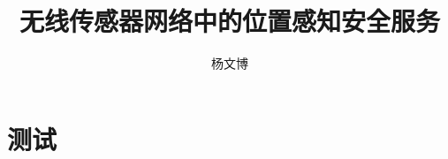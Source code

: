 \documentclass{article}
\title{无线传感器网络中的位置感知安全服务}
\author{杨文博}
\begin{document}
\maketitle
\section{测试}
\end{document}

